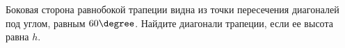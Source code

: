 \begin{ex}
	\begin{condition}
		Боковая сторона равнобокой трапеции видна из точки пересечения диагоналей под углом, равным \( 60\degree \). Найдите диагонали трапеции, если ее высота равна \( h \).
	\end{condition}
\end{ex}